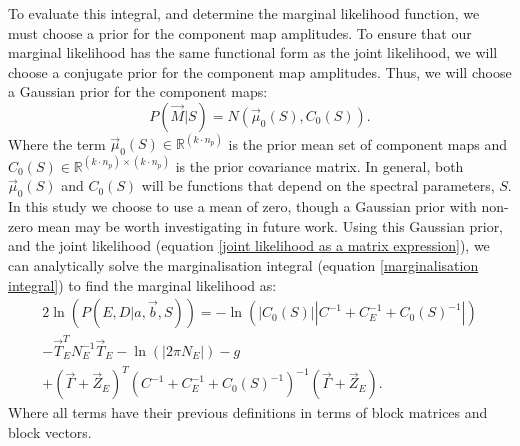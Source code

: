 \documentclass[fleqn,usenatbib]{mnras}
\begin{document}
To evaluate this integral, and determine the marginal likelihood function, we must choose a prior for the component map amplitudes. To ensure that our marginal likelihood has the same functional form as the joint likelihood, we will choose a conjugate prior for the component map amplitudes. Thus,  we will choose a Gaussian prior for the component maps: 
\begin{equation}
    P(\Vec{M}|S)=N\left(\Vec{\mu}_0(S),C_0(S)\right).
\end{equation}
Where the term $\Vec{\mu}_0(S) \in \mathbb{R}^{(k\cdot n_p)}$ is the prior mean set of component maps and $C_0(S) \in \mathbb{R}^{(k\cdot n_p)\times (k\cdot n_p)}$ is the prior covariance matrix. In general, both $\Vec{\mu}_0(S)$ and $C_0(S)$ will be functions that depend on the spectral parameters, $S$. In this study we choose to use a mean of zero, though a Gaussian prior with non-zero mean may be worth investigating in future work. Using this Gaussian prior, and the joint likelihood (equation \ref{joint likelihood as a matrix expression}), we can analytically solve the marginalisation integral (equation \ref{marginalisation integral}) to find the marginal likelihood as:
\begin{equation}
\label{marginal likelihood fully correct}
\begin{aligned}
    2\ln(P(E,D|a,\Vec{b},S)) = -\ln\left(\left|C_0(S)\right|\left|C^{-1} +C_E^{-1} + C_0(S)^{-1}\right|\right)\\- \Vec{T}_E^T N_E^{-1} \Vec{T}_E - \ln\left(\left|2\pi N_E\right|\right) - g \\ + \left(\Vec{\Gamma}+\Vec{Z}_E\right)^T\left(C^{-1} + C_E^{-1} + C_0(S)^{-1}\right)^{-1}\left(\Vec{\Gamma}+\Vec{Z}_E\right).
\end{aligned}
\end{equation}
Where all terms have their previous definitions in terms of block matrices and block vectors.
\end{document}
